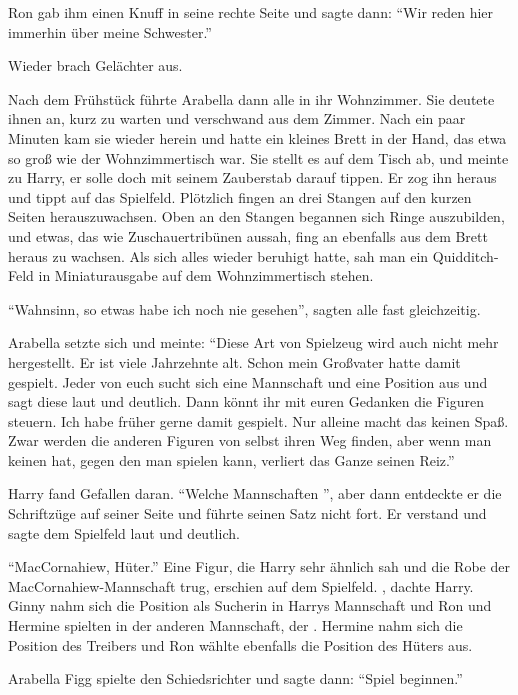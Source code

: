Ron gab ihm einen Knuff in seine rechte Seite und sagte dann: \enquote{Wir reden hier immerhin über meine Schwester.}

Wieder brach Gelächter aus.

Nach dem Frühstück führte Arabella dann alle in ihr Wohnzimmer. Sie deutete ihnen an, kurz zu warten und verschwand aus dem Zimmer. Nach ein paar Minuten kam sie wieder herein und hatte ein kleines Brett in der Hand, das etwa so groß wie der Wohnzimmertisch war. Sie stellt es auf dem Tisch ab, und meinte zu Harry, er solle doch mit seinem Zauberstab darauf tippen. Er zog ihn heraus und tippt auf das Spielfeld. Plötzlich fingen an drei Stangen auf den kurzen Seiten herauszuwachsen. Oben an den Stangen begannen sich Ringe auszubilden, und etwas, das wie Zuschauertribünen aussah, fing an ebenfalls aus dem Brett heraus zu wachsen. Als sich alles wieder beruhigt hatte, sah man ein Quidditch-Feld in Miniaturausgabe auf dem Wohnzimmertisch stehen.

\enquote{Wahnsinn, so etwas habe ich noch nie gesehen}, sagten alle fast gleichzeitig.

Arabella setzte sich und meinte: \enquote{Diese Art von Spielzeug wird auch nicht mehr hergestellt. Er ist viele Jahrzehnte alt. Schon mein Großvater hatte damit gespielt. Jeder von euch sucht sich eine Mannschaft und eine Position aus und sagt diese laut und deutlich. Dann könnt ihr mit euren Gedanken die Figuren steuern. Ich habe früher gerne damit gespielt. Nur alleine macht das keinen Spaß. Zwar werden die anderen Figuren von selbst ihren Weg finden, aber wenn man keinen hat, gegen den man spielen kann, verliert das Ganze seinen Reiz.}

Harry fand Gefallen daran. \enquote{Welche Mannschaften \abs}, aber dann entdeckte er die Schriftzüge auf seiner Seite und führte seinen Satz nicht fort. Er verstand und sagte dem Spielfeld laut und deutlich.

\enquote{MacCornahiew, Hüter.} Eine Figur, die Harry sehr ähnlich sah und die Robe der MacCornahiew-Mannschaft trug, erschien auf dem Spielfeld. , dachte Harry. Ginny nahm sich die Position als Sucherin in Harrys Mannschaft und Ron und Hermine spielten in der anderen Mannschaft, der . Hermine nahm sich die Position des Treibers und Ron wählte ebenfalls die Position des Hüters aus.

Arabella Figg spielte den Schiedsrichter und sagte dann: \enquote{Spiel beginnen.}

